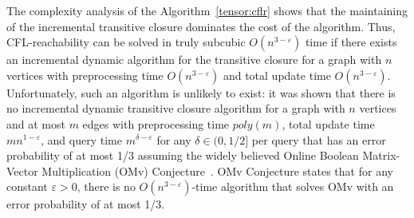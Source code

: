 The complexity analysis of the Algorithm~\ref{tensor:cflr} shows that the maintaining of the incremental transitive closure dominates the cost of the algorithm. Thus, CFL-reachability can be solved in truly subcubic $O(n^{3-\varepsilon})$ time if there exists an incremental dynamic algorithm for the transitive closure for a graph with $n$ vertices with preprocessing time $O(n^{3-\varepsilon})$ and total update time $O(n^{3-\varepsilon})$. Unfortunately, such an algorithm is unlikely to exist: it was shown that there is no incremental dynamic transitive closure algorithm for a graph with $n$ vertices and at most $m$ edges with preprocessing time $poly(m)$, total update time $mn^{1-\varepsilon}$, and query time $m^{\delta-\varepsilon}$ for any $\delta \in (0, 1/2]$ per query that has an error probability of at most 1/3 assuming the widely believed Online Boolean Matrix-Vector Multiplication (OMv) Conjecture~\cite{10.1145/2746539.2746609}. OMv Conjecture states that for any constant $ \varepsilon>0$, there is no $O(n^{3-\varepsilon})$-time algorithm that solves OMv with an error probability of at most 1/3.
